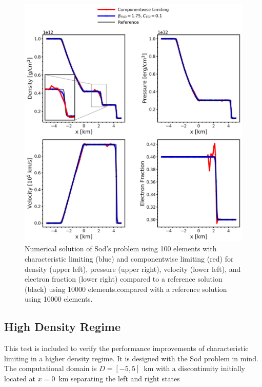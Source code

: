 \documentclass[onecolumn]{aastex62}
\begin{document}

\begin{figure}[h!]
  \centering
  \includegraphics[width=36pc]{./figures/characteristic_cw.png}
  \caption{\label{fig:SodSedovCW} Numerical solution of Sod's problem using
  100 elements with characteristic limiting (blue) and componentwise limiting
  (red) for density (upper left), pressure (upper right),
  velocity (lower left), and electron fraction (lower right)
  compared to a reference solution (black) using 10000 elements.compared with a reference solution using 10000 elements.}
\end{figure}

\vspace{1cm}
\subsection{High Density Regime}
This test is included to verify the performance improvements of characteristic
limiting in a higher density regime. It is designed with the Sod problem in mind.
The computational domain is $D = [-5,5]$~km
with a discontinuity initially located at $x = 0$~km separating the left and right states
\end{document}
